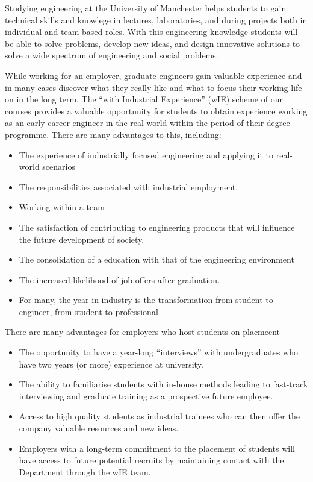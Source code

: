 \documentclass[
]{book}
\providecommand{\tightlist}{%
  \setlength{\itemsep}{0pt}\setlength{\parskip}{0pt}}
\begin{document}
Studying engineering at the University of Manchester helps students to gain technical skills and knowlege in lectures, laboratories, and during projects both in individual and team-based roles. With this engineering knowledge students will be able to solve problems, develop new ideas, and design innovative solutions to solve a wide spectrum of engineering and social problems.

While working for an employer, graduate engineers gain valuable experience and in many cases discover what they really like and what to focus their working life on in the long term. The ``with Industrial Experience'' (wIE) scheme of our courses provides a valuable opportunity for students to obtain experience working as an early-career engineer in the real world within the period of their degree programme. There are many advantages to this, including:

\begin{itemize}
\tightlist
\item
  The experience of industrially focused engineering and applying it to real-world scenarios
\item
  The responsibilities associated with industrial employment.
\item
  Working within a team
\item
  The satisfaction of contributing to engineering products that will influence the future development of society.
\item
  The consolidation of a education with that of the engineering environment
\item
  The increased likelihood of job offers after graduation.
\item
  For many, the year in industry is the transformation from student to engineer, from student to professional
\end{itemize}

There are many advantages for employers who host students on placmeent

\begin{itemize}
\tightlist
\item
  The opportunity to have a year-long ``interviews'' with undergraduates who have two years (or more) experience at university.
\item
  The ability to familiarise students with in-house methods leading to fast-track interviewing and graduate
  training as a prospective future employee.
\item
  Access to high quality students as industrial trainees who can then offer the company valuable resources and new ideas.
\item
  Employers with a long-term commitment to the placement of students will have access to future potential recruits by maintaining contact with the Department through the wIE team.
\end{itemize}
\end{document}
